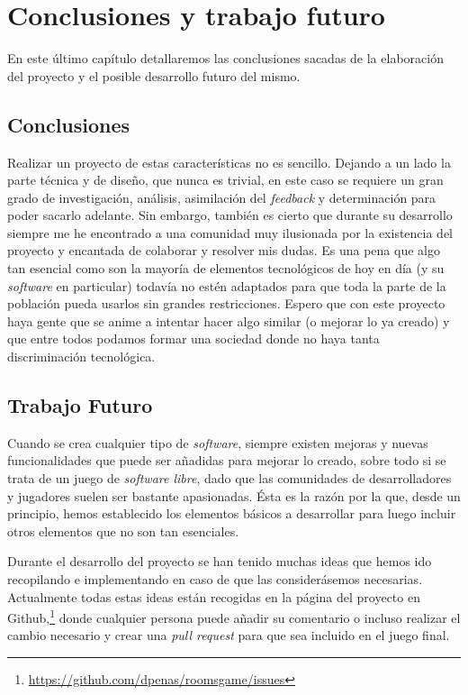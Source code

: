 \chapter{Conclusiones y trabajo futuro}

En este último capítulo detallaremos las conclusiones sacadas de la elaboración del proyecto y el posible desarrollo futuro del mismo.

\section{Conclusiones}

Realizar un proyecto de estas características no es sencillo. Dejando a un lado la parte técnica y de diseño, que nunca es trivial, en este caso se requiere un gran grado de investigación, análisis, asimilación del \textit{feedback} y determinación para poder sacarlo adelante. Sin embargo, también es cierto que durante su desarrollo siempre me he encontrado a una comunidad muy ilusionada por la existencia del proyecto y encantada de colaborar y resolver mis dudas.
Es una pena que algo tan esencial como son la mayoría de elementos tecnológicos de hoy en día (y su \textit{software} en particular) todavía no estén adaptados para que toda la parte de la población pueda usarlos sin grandes restricciones. Espero que con este proyecto haya gente que se anime a intentar hacer algo similar (o mejorar lo ya creado) y que entre todos podamos formar una sociedad donde no haya tanta discriminación tecnológica.

\section{Trabajo Futuro}

Cuando se crea cualquier tipo de \textit{software}, siempre existen mejoras y nuevas funcionalidades que puede ser añadidas para mejorar lo creado, sobre todo si se trata de un juego de \textit{software libre}, dado que las comunidades de desarrolladores y jugadores suelen ser bastante apasionadas. Ésta es la razón por la que, desde un principio, hemos establecido los elementos básicos a desarrollar para luego incluir otros elementos que no son tan esenciales.

Durante el desarrollo del proyecto se han tenido muchas ideas que hemos ido recopilando e implementando en caso de que las considerásemos necesarias. Actualmente todas estas ideas están recogidas en la página del proyecto en Github,\footnote{\url{https://github.com/dpenas/roomsgame/issues}} donde cualquier persona puede añadir su comentario o incluso realizar el cambio necesario y crear una \textit{pull request} para que sea incluido en el juego final.

